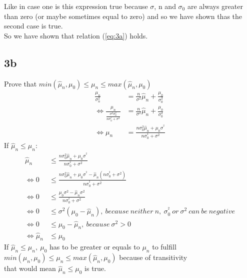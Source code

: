 Like in case one is this expression true because $\sigma$, n and $\sigma_{0}$ are always greater than zero (or maybe sometimes equal to zero) and so we have shown thas the second case is true.\\
So we have shown that relation (\ref{eq:3a}) holds.

\subsection*{3b}
Prove that $min(\hat{\mu}_n, \mu_0)\leq \mu_n \leq max(\hat{\mu}_n, \mu_0)$
\begin{align*}
   \frac{\mu_n}{\sigma^{2}_{n}} &= \frac{n}{\sigma^{2}}\hat{\mu}_n+\frac{\mu_0}{\sigma^{2}_0}\\
   \Leftrightarrow\frac{\mu_n}{\frac{\sigma^2\sigma^{2}_{0}}{n\sigma^{^2}_{0}+\sigma^{2}}} &= \frac{n}{\sigma^{2}}\hat{\mu}_n+\frac{\mu_0}{\sigma^{2}_0}\\
   \Leftrightarrow \mu_n&=\frac{n\sigma^{2}_0\hat{\mu}_n + \mu_0\sigma^{^2}}{n\sigma^{^2}_{0}+\sigma^{2}}
\end{align*}
\hspace*{2mm}If $\hat{\mu}_n \leq \mu_n$:
\begin{align*}
\hat{\mu}_n &\leq\frac{n\sigma^{2}_0\hat{\mu}_n + \mu_0\sigma^{^2}}{n\sigma^{^2}_{0}+\sigma^{2}}\\
\Leftrightarrow0&\leq\frac{n\sigma^{2}_0\hat{\mu}_n + \mu_0\sigma^{^2}-\hat{\mu}_n(n\sigma^{^2}_{0}+\sigma^{2})}{n\sigma^{^2}_{0}+\sigma^{2}}\\
\Leftrightarrow0&\leq\frac{\mu_0\sigma^{2}-\hat{\mu}_n\sigma^{2}}{n\sigma^{^2}_{0}+\sigma^{2}}\\
\Leftrightarrow 0&\leq \sigma^{2}(\mu_0-\hat{\mu}_n),\ because\ neither\ n,\ \sigma^{^2}_{0}\ or\ \sigma^{2}\ can\ be\ negative\\
\Leftrightarrow 0&\leq \mu_0-\hat{\mu}_n,\ because\ \sigma^{2}>0\\
\Leftrightarrow \hat{\mu}_n&\leq \mu_0
\end{align*}
\hspace{10mm}If $\hat{\mu}_n \leq \mu_n ,\ \mu_0$ has to be greater or equals to $\mu_n$ to fulfill \\\hspace*{10mm}$min(\hat{\mu}_n, \mu_0)\leq \mu_n \leq max(\hat{\mu}_n, \mu_0)$ because of transitivity\\ 
\hspace*{10mm}that would mean $\hat{\mu}_n\leq \mu_0$ is true.\\ \\
